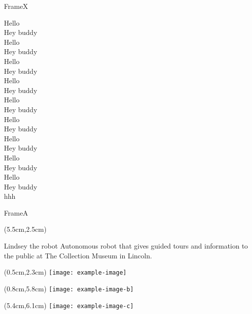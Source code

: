 \documentclass[english,svgnames,notes=hide,aspectratio=169,14pt]{beamer}
\begin{document}
\begin{frame}[allowframebreaks]{FrameX}

   Hello \\
   Hey buddy \\
   Hello \\
   Hey buddy \\
   Hello \\
   Hey buddy \\
   Hello \\
   Hey buddy \\
   Hello \\
   Hey buddy \\
   Hello \\
   Hey buddy \\
   Hello \\
   Hey buddy \\
   Hello \\
   Hey buddy \\
   Hello \\
   Hey buddy \\
   hhh

\end{frame}


\begin{frame}{FrameA}

   \begin{textblock*}{7cm}(5.5cm,2.5cm)
      \begin{block}{Lindsey the robot}
         Autonomous robot that gives guided tours and information to
         the public at The Collection Museum in Lincoln.
      \end{block}
   \end{textblock*}

   \begin{textblock*}{4.4cm}(0.5cm,2.3cm)
      \texttt{[image: example-image]}
   \end{textblock*}

   \begin{textblock*}{3.5cm}(0.8cm,5.8cm)
      \texttt{[image: example-image-b]}
   \end{textblock*}

   \begin{textblock*}{3cm}(5.4cm,6.1cm)
      \texttt{[image: example-image-c]}
   \end{textblock*}

\end{frame}
\end{document}
